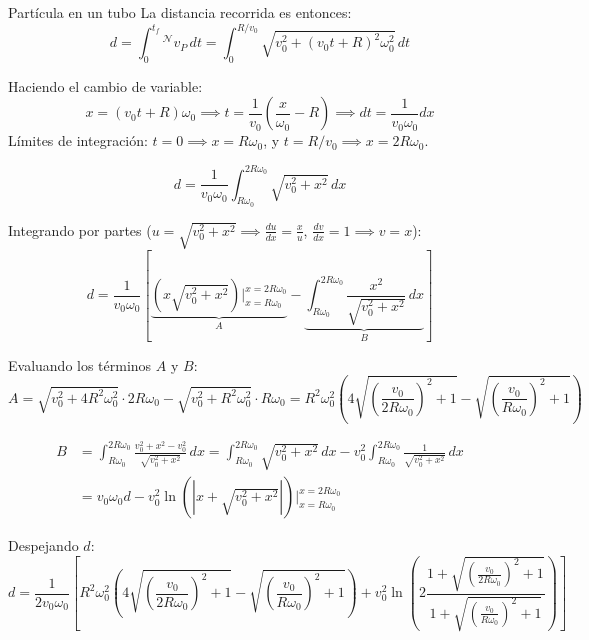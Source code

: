 \begin{solucion}{Partícula en un tubo}
\noindent La distancia recorrida es entonces:
\[
d = \int_{0}^{t_f} {}^{\mathcal{N}}v_P \, dt = \int_{0}^{R/v_0} \sqrt{v_0^2 + (v_0 t + R)^2 \omega_0^2} \, dt
\]

\noindent Haciendo el cambio de variable:
\[
x = (v_0 t + R)\omega_0 \implies t = \frac{1}{v_0}\left(\frac{x}{\omega_0} - R\right) \implies dt = \frac{1}{v_0 \omega_0} dx
\]
\noindent Límites de integración: $t = 0 \implies x = R\omega_0$, y $t = R/v_0 \implies x = 2R\omega_0$.

\[
d = \frac{1}{v_0 \omega_0} \int_{R\omega_0}^{2R\omega_0} \sqrt{v_0^2 + x^2} \, dx
\]

\noindent Integrando por partes ($u = \sqrt{v_0^2 + x^2} \implies \frac{du}{dx} = \frac{x}{u}$, $\frac{dv}{dx} = 1 \implies v = x$):
\[
d = \frac{1}{v_0 \omega_0} \left[ \underbrace{\left( x \sqrt{v_0^2 + x^2} \right)\Bigg|_{x=R\omega_0}^{x=2R\omega_0}}_{A} - \underbrace{\int_{R\omega_0}^{2R\omega_0} \frac{x^2}{\sqrt{v_0^2 + x^2}} \, dx}_{B} \right]
\]

\noindent Evaluando los términos $A$ y $B$:
\[
A = \sqrt{v_0^2 + 4R^2\omega_0^2} \cdot 2R\omega_0 - \sqrt{v_0^2 + R^2\omega_0^2} \cdot R\omega_0 = R^2\omega_0^2 \left( 4 \sqrt{\left(\frac{v_0}{2R\omega_0}\right)^2 + 1} - \sqrt{\left(\frac{v_0}{R\omega_0}\right)^2 + 1} \right)
\]

\[
\begin{aligned}
B &= \int_{R\omega_0}^{2R\omega_0} \frac{v_0^2 + x^2 - v_0^2}{\sqrt{v_0^2 + x^2}} \, dx = \int_{R\omega_0}^{2R\omega_0} \sqrt{v_0^2 + x^2} \, dx - v_0^2 \int_{R\omega_0}^{2R\omega_0} \frac{1}{\sqrt{v_0^2 + x^2}} \, dx \\
&= v_0 \omega_0 d - v_0^2 \ln \left( \left| x + \sqrt{v_0^2 + x^2} \right| \right) \Bigg|_{x=R\omega_0}^{x=2R\omega_0}
\end{aligned}
\]

\noindent Despejando $d$:
\[
{d = \frac{1}{2 v_0 \omega_0} \left[ R^2 \omega_0^2 \left( 4 \sqrt{\left(\frac{v_0}{2R\omega_0}\right)^2 + 1} - \sqrt{\left(\frac{v_0}{R\omega_0}\right)^2 + 1} \right) + v_0^2 \ln \left( 2 \frac{1 + \sqrt{\left(\frac{v_0}{2R\omega_0}\right)^2 + 1}}{1 + \sqrt{\left(\frac{v_0}{R\omega_0}\right)^2 + 1}} \right) \right]}
\]
\end{solucion}

